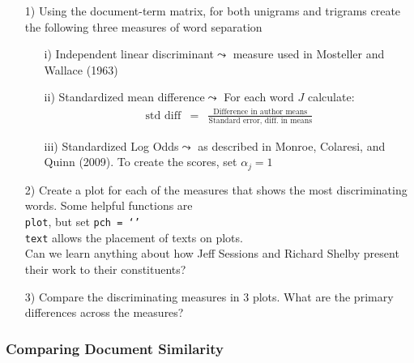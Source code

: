 \documentclass[12pt,letterpaper]{article}
\begin{document}
\begin{itemize}
\item[1)] Using the document-term matrix, for both unigrams and trigrams create the following three measures of word separation
\begin{itemize}
\item[i)] Independent linear discriminant$\leadsto$ measure used in Mosteller and Wallace (1963) 
\item[ii)] Standardized mean difference$\leadsto$ For each word $J$ calculate:
\begin{eqnarray}
\text{std diff} & = &\frac{\text{Difference in author means}}{\text{Standard error, diff. in means}}\nonumber 
\end{eqnarray}
\item[iii)] Standardized Log Odds$\leadsto$ as described in Monroe, Colaresi, and Quinn (2009). To create the scores,  set $\alpha_{j} = 1$
\end{itemize}
\item[2)] Create a plot for each of the measures that shows the most discriminating words.  Some helpful functions are \\
{\tt plot}, but set {\tt pch = `'} \\
{\tt text}  allows the placement of texts on plots. \\
Can we learn anything about how Jeff Sessions and Richard Shelby present their work to their constituents?\\
\item[3)] Compare the discriminating measures in 3 plots.  What are the primary differences across the measures?
\end{itemize}

\subsubsection*{Comparing Document Similarity}
\end{document}
